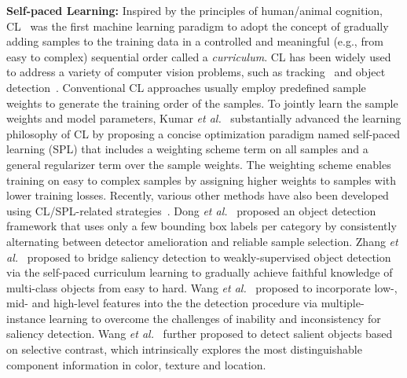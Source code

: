 \documentclass[journal]{IEEEtran}
\begin{document}

\textbf{Self-paced Learning:} Inspired by the principles of human/animal cognition, CL~\cite{curriculun_learning} was the first machine learning paradigm to adopt the concept of gradually adding samples to the training data in a controlled and meaningful (e.g., from easy to complex) sequential order called a {\em curriculum}. CL has been widely used to address a variety of computer vision problems, such as tracking~\cite{supancic2013self} and object detection~\cite{NIPS2012_4691}. Conventional CL approaches usually employ predefined sample weights to generate the training order of the samples. To jointly learn the sample weights and model parameters, Kumar {\em et al.}~\cite{spl_kumar} substantially advanced the learning philosophy of CL by proposing {a concise optimization paradigm named self-paced learning (SPL)} that includes a weighting scheme term on all samples and a general regularizer term over the sample weights. The weighting scheme enables training on easy to complex samples by assigning higher weights to samples with lower training losses. Recently, various other methods have also been developed using CL/SPL-related strategies~\cite{spl_reranking, spld, spcl}. Dong {\em et al.}~\cite{MSPLD} proposed an object detection framework that uses only a few bounding box labels per category by consistently alternating between detector amelioration and reliable sample selection. {Zhang {\em et al.}~\cite{bsd16IJCAI} proposed to bridge saliency detection to weakly-supervised object detection via the self-paced curriculum learning to gradually achieve faithful knowledge of multi-class objects from easy to hard. Wang {\em et al.}~\cite{sdm13tcyb} proposed to incorporate low-, mid- and high-level features into the the detection procedure via multiple-instance learning to overcome the challenges of inability and inconsistency for saliency detection. Wang {\em et al.}~\cite{vssc13tcsvt} further proposed to detect salient objects based on selective contrast, which intrinsically explores the most distinguishable component information in color, texture and location.}


\end{document}
